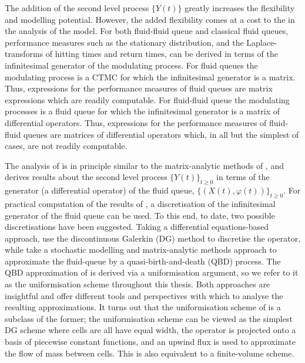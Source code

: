 The addition of the second level process \(\{Y(t)\}\) greatly increases the flexibility and modelling potential. However, the added flexibility comes at a cost to the in the analysis of the model. For both fluid-fluid queue and classical fluid queues, performance measures such as the stationary distribution, and the Laplace-transforms of hitting times and return times, can be derived in terms of the infinitesimal generator of the modulating process. For fluid queues the modulating process is a CTMC for which the infinitesimal generator is a matrix. Thus, expressions for the performance measures of fluid queues are matrix expressions which are readily computable. For fluid-fluid queue the modulating processes is a fluid queue for which the infinitesimal generator is a matrix of differential operators. Thus, expressions for the performance measures of fluid-fluid queues are matrices of differential operators which, in all but the simplest of cases, are not readily computable. 

The analysis of \cite{bo2014} is in principle similar to the matrix-analytic methods of \cite{bean2005}, and derives results about the second level process \(\{Y(t)\}_{t\geq0}\) in terms of the generator (a differential operator) of the fluid queue, \(\{(X(t),\varphi(t))\}_{t\geq0}\). For practical computation of the results of \cite{bo2014}, a discretisation of the infinitesimal generator of the fluid queue can be used. To this end, to date, two possible discretisations have been suggested. Taking a differential equations-based approach, \cite{blnos2022} use the discontinuous Galerkin (DG) method to discretise the operator, while \cite{bo2013} take a stochastic modelling and matrix-analytic methods approach to approximate the fluid-queue by a quasi-birth-and-death (QBD) process. The QBD approximation of \cite{bo2013} is derived via a uniformisation argument, so we refer to it as the uniformisation scheme throughout this thesis. Both approaches are insightful and offer different tools and perspectives with which to analyse the resulting approximations. It turns out that the uniformisation scheme of \cite{bo2013} is a subclass of the former; the uniformisation scheme can be viewed as the simplest DG scheme where cells are all have equal width, the operator is projected onto a basis of piecewise constant functions, and an upwind flux is used to approximate the flow of mass between cells. This is also equivalent to a finite-volume scheme.


